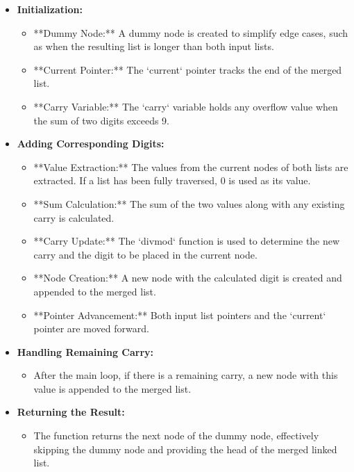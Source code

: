 \begin{itemize}
    \item \textbf{Initialization:}
    \begin{itemize}
        \item **Dummy Node:** A dummy node is created to simplify edge cases, such as when the resulting list is longer than both input lists.
        \item **Current Pointer:** The `current` pointer tracks the end of the merged list.
        \item **Carry Variable:** The `carry` variable holds any overflow value when the sum of two digits exceeds 9.
    \end{itemize}
    
    \item \textbf{Adding Corresponding Digits:}
    \begin{itemize}
        \item **Value Extraction:** The values from the current nodes of both lists are extracted. If a list has been fully traversed, 0 is used as its value.
        \item **Sum Calculation:** The sum of the two values along with any existing carry is calculated.
        \item **Carry Update:** The `divmod` function is used to determine the new carry and the digit to be placed in the current node.
        \item **Node Creation:** A new node with the calculated digit is created and appended to the merged list.
        \item **Pointer Advancement:** Both input list pointers and the `current` pointer are moved forward.
    \end{itemize}
    
    \item \textbf{Handling Remaining Carry:}
    \begin{itemize}
        \item After the main loop, if there is a remaining carry, a new node with this value is appended to the merged list.
    \end{itemize}
    
    \item \textbf{Returning the Result:}
    \begin{itemize}
        \item The function returns the next node of the dummy node, effectively skipping the dummy node and providing the head of the merged linked list.
    \end{itemize}
\end{itemize}

